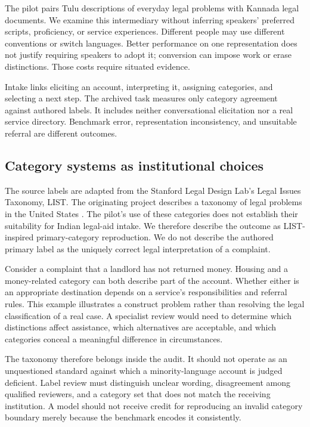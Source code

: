 \documentclass[manuscript,screen,review,anonymous]{acmart}
\begin{document}
The pilot pairs Tulu descriptions of everyday legal problems with Kannada legal documents. We examine this intermediary without inferring speakers' preferred scripts, proficiency, or service experiences. Different people may use different conventions or switch languages. Better performance on one representation does not justify requiring speakers to adopt it; conversion can impose work or erase distinctions. Those costs require situated evidence.

Intake links eliciting an account, interpreting it, assigning categories, and selecting a next step. The archived task measures only category agreement against authored labels. It includes neither conversational elicitation nor a real service directory. Benchmark error, representation inconsistency, and unsuitable referral are different outcomes.

\subsection{Category systems as institutional choices}

The source labels are adapted from the Stanford Legal Design Lab's Legal Issues Taxonomy, LIST. The originating project describes a taxonomy of legal problems in the United States \cite{list}. The pilot's use of these categories does not establish their suitability for Indian legal-aid intake. We therefore describe the outcome as LIST-inspired primary-category reproduction. We do not describe the authored primary label as the uniquely correct legal interpretation of a complaint.

Consider a complaint that a landlord has not returned money. Housing and a money-related category can both describe part of the account. Whether either is an appropriate destination depends on a service's responsibilities and referral rules. This example illustrates a construct problem rather than resolving the legal classification of a real case. A specialist review would need to determine which distinctions affect assistance, which alternatives are acceptable, and which categories conceal a meaningful difference in circumstances.

The taxonomy therefore belongs inside the audit. It should not operate as an unquestioned standard against which a minority-language account is judged deficient. Label review must distinguish unclear wording, disagreement among qualified reviewers, and a category set that does not match the receiving institution. A model should not receive credit for reproducing an invalid category boundary merely because the benchmark encodes it consistently.
\end{document}

